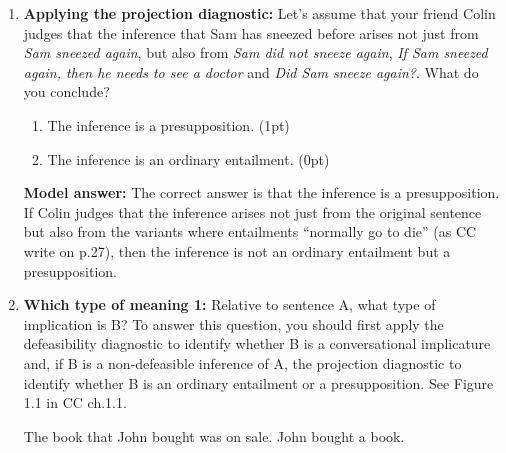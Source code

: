 \documentclass[a4,11pt]{article}
\begin{document}
\begin{enumerate}[leftmargin = 12pt]
{\bf Model answer:}  The correct answers are {\em Sam did not sneeze again}, {\em If Sam sneezed again, then he needs to see a doctor} and {\em Did Sam sneeze again?}. These are versions of the sentence {\em Sam sneezed again}: its negation, its polar question version and a conditional version. The answers {\em Who sneezed?} and {\em  Why did Sam sneeze again?} are versions of the original sentence but they are not relevant for diagnosing presuppositions because they are content questions rather than the polar question version. The question {\em Does Sam have allergies?} is not a version of the original sentence, so it is also not relevant for diagnosing the status of the inference that Sam has sneezed before relative to the sentence {\em Sam sneezed again}.
  
  \item {\bf Applying the projection diagnostic:} Let's assume that your friend Colin judges that the inference that Sam has sneezed before arises not just from {\em Sam sneezed again}, but also from {\em Sam did not sneeze again}, {\em If Sam sneezed again, then he needs to see a doctor} and {\em Did Sam sneeze again?}. What do you conclude?
   
    \begin{enumerate}[noitemsep]
        \item The inference is a presupposition. (1pt)
 	\item The inference is an ordinary entailment. (0pt)
    \end{enumerate}
  
{\bf Model answer:}  The correct answer is that the inference is a presupposition. If Colin judges that the inference arises not just from the original sentence but also from the variants where entailments ``normally go to die'' (as CC write on p.27), then the inference is not an ordinary entailment but a presupposition.

       
 \item {\bf Which type of meaning 1:} Relative to sentence A, what type of implication is B? To answer this question, you should first apply the defeasibility diagnostic to identify whether B is a conversational implicature and, if B is a non-defeasible inference of A, the projection diagnostic to identify whether B is an ordinary entailment or a presupposition. See Figure 1.1 in CC ch.1.1.
\begin{exe}
\exi{}
\begin{xlist}
 The book that John bought was on sale.
 John bought a book.
\end{xlist}
\end{exe}


\end{enumerate}
\end{document}
